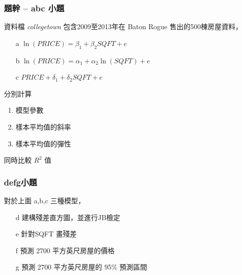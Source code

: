 \begin{frame}
    \frametitle{題幹 -- abc 小題}

    資料檔 \emph{collegetown} 包含2009至2013年在
    Baton Rogue 售出的500棟房屋資料，

    \begin{enumerate}
        \item[a] $\ln(PRICE) = \beta_1 + \beta_2 SQFT +e$
        \item[b] $\ln(PRICE) = \alpha_1 + \alpha_2 \ln(SQFT) + e$
        \item[c] $PRICE + \delta_1 + \delta_2 SQFT +e $ 
    \end{enumerate}

    分別計算
    \begin{enumerate}
        \item 模型參數
        \item 樣本平均值的斜率
        \item 樣本平均值的彈性
    \end{enumerate}

    同時比較 $R^2$ 值
\end{frame}

\begin{frame}
    \frametitle{defg小題}
    對於上面 a,b,c 三種模型，
    \begin{enumerate}
        \item[d] 建構殘差直方圖，並進行JB檢定
        \item[e] 針對SQFT 畫殘差
        \item[f] 預測 2700 平方英尺房屋的價格
        \item[g] 預測 2700 平方英尺房屋的 95\% 預測區間
    \end{enumerate}

    

\end{frame}